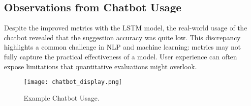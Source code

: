 \subsection{Observations from Chatbot Usage}

Despite the improved metrics with the LSTM model, the real-world usage of the chatbot revealed that the suggestion accuracy was quite low. This discrepancy highlights a common challenge in NLP and machine learning: metrics may not fully capture the practical effectiveness of a model. User experience can often expose limitations that quantitative evaluations might overlook.

\begin{figure}[h!]
    \centering
    \texttt{[image: chatbot\_display.png]}
    \caption{Example Chatbot Usage.}
    \label{fig:lchatbot_display}
\end{figure}